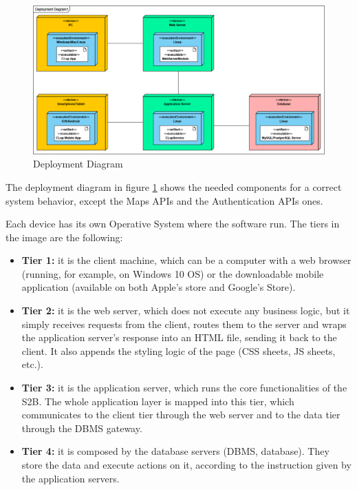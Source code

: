 \documentclass[table, 12pt]{article}
\begin{document}
\begin{figure}[H]
    \begin{center}
        \includegraphics[width=\textwidth]{assets/Deployment-Diagram/DeploymentDiagram1.png}
        \caption{Deployment Diagram}
        \label{deployment_diagram}
    \end{center}
\end{figure}

The deployment diagram in figure \ref{deployment_diagram} shows the needed components for a correct system behavior, except the Maps APIs and the Authentication APIs ones.

Each device has its own Operative System where the software run. The tiers in the image are the following:
\begin{itemize}
    \item \textbf{Tier 1:} it is the client machine, which can be a computer with a web browser (running, for example, on Windows 10 OS) or the downloadable mobile application (available on both Apple's store and Google's Store).
    \item \textbf{Tier 2:} it is the web server, which does not execute any business logic, but it simply receives requests from the client, routes them to the server and wraps the application server's response into an HTML file, sending it back to the client. It also appends the styling logic of the page (CSS sheets, JS sheets, etc.).
    \item \textbf{Tier 3:} it is the application server, which runs the core functionalities of the S2B. The whole application layer is mapped into this tier, which communicates to the client tier through the web server and to the data tier through the DBMS gateway.
    \item \textbf{Tier 4:} it is composed by the database servers (DBMS, database). They store the data and execute actions on it, according to the instruction given by the application servers.
\end{itemize}
\end{document}
